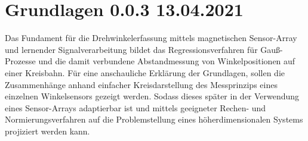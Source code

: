 %

\chapter{Grundlagen 0.0.3 13.04.2021}\label{ch:grundlagen}

Das Fundament für die Drehwinkelerfassung mittels magnetischen Sensor-Array und lernender Signalverarbeitung 
\cite{Schuethe2019}\cite{Schuethe2020a}\cite{Schuethe2020} bildet das Regressionsverfahren für Gauß-Prozesse 
\cite{Rasmussen2006} und die damit verbundene Abstandmessung von Winkelpositionen auf einer Kreisbahn.
Für eine anschauliche Erklärung der Grundlagen, sollen die Zusammenhänge anhand einfacher Kreisdarstellung des 
Messprinzips eines einzelnen Winkelsensors gezeigt werden. Sodass dieses später in der Verwendung eines Sensor-Arrays 
adaptierbar ist und mittels geeigneter Rechen- und Normierungsverfahren auf die Problemstellung eines 
höherdimensionalen Systems projiziert werden kann.










